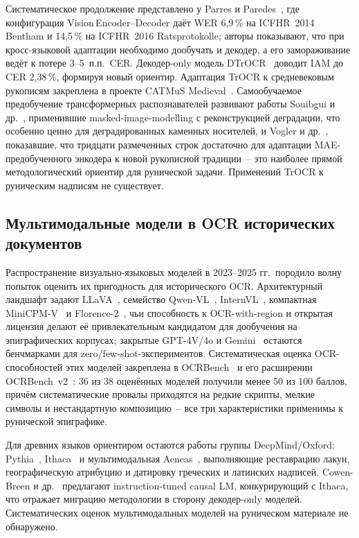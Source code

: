 \documentclass[a4paper,12pt]{extarticle}
\begin{document}
Систематическое продолжение представлено у Parres и Paredes~\cite{parres2023}, где конфигурация Vision\,Encoder--Decoder даёт WER 6,9\,\% на ICFHR~2014 Bentham и 14,5\,\% на ICFHR~2016 Ratsprotokolle; авторы показывают, что при кросс-языковой адаптации необходимо дообучать и декодер, а его замораживание ведёт к потере 3--5~п.п.\ CER. Декодер-only модель DTrOCR~\cite{fujitake2024} доводит IAM до CER 2,38\,\%, формируя новый ориентир. Адаптация TrOCR к средневековым рукописям закреплена в проекте CATMuS Medieval~\cite{clerice2024}. Самообучаемое предобучение трансформерных распознавателей развивают работы Souibgui и др.~\cite{souibgui2023textdiae}, применившие masked-image-modelling с реконструкцией деградации, что особенно ценно для деградированных каменных носителей, и Vogler и др.~\cite{vogler2022}, показавшие, что тридцати размеченных строк достаточно для адаптации MAE-предобученного энкодера к новой рукописной традиции~-- это наиболее прямой методологический ориентир для рунической задачи. Применений TrOCR к руническим надписям не существует.

\subsection{Мультимодальные модели в OCR исторических документов}
\label{sec:lit-vlm}

Распространение визуально-языковых моделей в 2023--2025 гг.\ породило волну попыток оценить их пригодность для исторического OCR. Архитектурный ландшафт задают LLaVA~\cite{liu2023llava}, семейство Qwen-VL~\cite{wang2024qwen2vl}, InternVL~\cite{chen2024internvl}, компактная MiniCPM-V~\cite{yao2025minicpm} и Florence-2~\cite{xiao2024florence}, чьи способность к OCR-with-region и открытая лицензия делают её привлекательным кандидатом для дообучения на эпиграфических корпусах; закрытые GPT-4V/4o и Gemini~\cite{geminiteam2023} остаются бенчмарками для zero/few-shot-экспериментов. Систематическая оценка OCR-способностей этих моделей закреплена в OCRBench~\cite{liu2024ocrbench} и его расширении OCRBench~v2~\cite{fu2025ocrbench2}: 36 из 38 оценённых моделей получили менее 50 из 100 баллов, причём систематические провалы приходятся на редкие скрипты, мелкие символы и нестандартную композицию~-- все три характеристики применимы к рунической эпиграфике.

Для древних языков ориентиром остаются работы группы DeepMind/Oxford: Pythia~\cite{assael2019}, Ithaca~\cite{assael2022} и мультимодальная Aeneas~\cite{assael2025}, выполняющие реставрацию лакун, географическую атрибуцию и датировку греческих и латинских надписей. Cowen-Breen и др.~\cite{cowenbreen2024} предлагают instruction-tuned causal LM, конкурирующий с Ithaca, что отражает миграцию методологии в сторону декодер-only моделей. Систематических оценок мультимодальных моделей на руническом материале не обнаружено.
\end{document}
